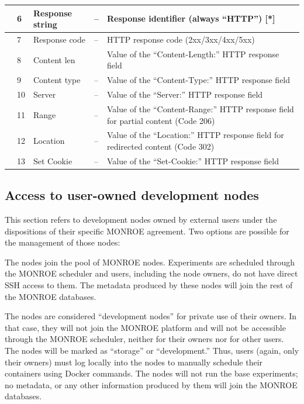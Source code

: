 \documentclass[a4paper,10pt]{article}
\newcommand{\monroe}{MONROE}
\begin{document}
\begin{table}[tp]
{\begin{center}
\begin{tabular*}{1\textwidth}{|l|l|l|l|p{}}
													& \cellcolor{LightGreen}6			& Response string	& --	& Response identifier (always ``HTTP'') [*] \\ \hline
													& \cellcolor{LightGreen}7			& Response code		& --	& HTTP response code (2xx/3xx/4xx/5xx) \\ \hline
													& \cellcolor{LightGreen}8			& Content len		& \si{\byte}	& Value of the ``Content-Length:'' HTTP response field \\ \hline
													& \cellcolor{LightGreen}9			& Content type		& --	& Value of the ``Content-Type:'' HTTP response field \\ \hline
													& \cellcolor{LightGreen}10			& Server			& --	& Value of the ``Server:'' HTTP response field \\ \hline
													& \cellcolor{LightGreen}11			& Range				& --	& Value of the ``Content-Range:'' HTTP response field for partial content (Code 206) \\ \hline
													& \cellcolor{LightGreen}12			& Location			& --	& Value of the ``Location:'' HTTP response field for redirected content (Code 302) \\ \hline
													& \cellcolor{LightGreen}13			& Set Cookie		& --	& Value of the ``Set-Cookie:'' HTTP response field \\
			\bottomrule
		\end{tabular*}
	\end{center}
	}
\end {table}

\subsection{Access to user-owned development nodes}

This section refers to development nodes owned by external users under the dispositions of their specific \monroe{} agreement.
Two options are possible for the management of those nodes:
\begin{enumerate*}
	\item The nodes join the pool of \monroe{} nodes.
	Experiments are scheduled through the \monroe{} scheduler and users, including the node owners, do not have direct SSH access to them.
	The metadata produced by these nodes will join the rest of the \monroe{} databases.
	\item The nodes are considered ``development nodes'' for private use of their owners.
	In that case, they will not join the \monroe{} platform and will not be accessible through the \monroe{} scheduler, neither for their owners nor for other users.
	The nodes will be marked as ``storage'' or ``development.''
	Thus, users (again, only their owners) must log locally into the nodes to manually schedule their containers using Docker commands.
	The nodes will not run the base experiments; no metadata, or any other information produced by them will join the \monroe{} databases.
\end{enumerate*}
\end{document}
